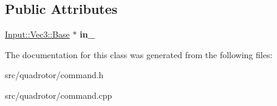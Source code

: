 \subsection*{\-Public \-Attributes}
\begin{DoxyCompactItemize}
\item 
\hypertarget{classCommand_1_1X_a238b01c438610d3523c8276a5635cdc2}{\hyperlink{classInput_1_1Vec3_1_1Base}{\-Input\-::\-Vec3\-::\-Base} $\ast$ {\bfseries in\-\_\-}}\label{classCommand_1_1X_a238b01c438610d3523c8276a5635cdc2}

\end{DoxyCompactItemize}


\-The documentation for this class was generated from the following files\-:\begin{DoxyCompactItemize}
\item 
src/quadrotor/command.\-h\item 
src/quadrotor/command.\-cpp\end{DoxyCompactItemize}
